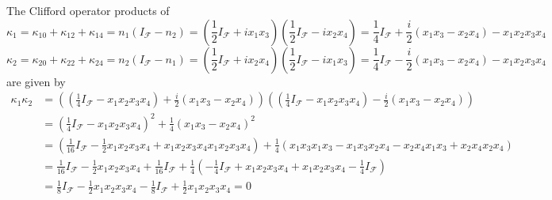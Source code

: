 \documentclass[aps,preprint]{revtex4}%
\begin{document}
The Clifford operator products of
\begin{equation}
\kappa_{1}=\kappa_{10}+\kappa_{12}+\kappa_{14}=n_{1}\left(  I_{\mathcal{F}%
}-n_{2}\right)  =\left(  \frac{1}{2}I_{\mathcal{F}}+ix_{1}x_{3}\right)
\left(  \frac{1}{2}I_{\mathcal{F}}-ix_{2}x_{4}\right)  =\frac{1}%
{4}I_{\mathcal{F}}+\frac{i}{2}\left(  x_{1}x_{3}-x_{2}x_{4}\right)
-x_{1}x_{2}x_{3}x_{4}%
\end{equation}%
\begin{equation}
\kappa_{2}=\kappa_{20}+\kappa_{22}+\kappa_{24}=n_{2}\left(  I_{\mathcal{F}%
}-n_{1}\right)  =\left(  \frac{1}{2}I_{\mathcal{F}}+ix_{2}x_{4}\right)
\left(  \frac{1}{2}I_{\mathcal{F}}-ix_{1}x_{3}\right)  =\frac{1}%
{4}I_{\mathcal{F}}-\frac{i}{2}\left(  x_{1}x_{3}-x_{2}x_{4}\right)
-x_{1}x_{2}x_{3}x_{4}%
\end{equation}
are given by%
\begin{align*}
\kappa_{1}\kappa_{2} &  =\left(  \left(  \frac{1}{4}I_{\mathcal{F}}-x_{1}%
x_{2}x_{3}x_{4}\right)  +\frac{i}{2}\left(  x_{1}x_{3}-x_{2}x_{4}\right)
\right)  \left(  \left(  \frac{1}{4}I_{\mathcal{F}}-x_{1}x_{2}x_{3}%
x_{4}\right)  -\frac{i}{2}\left(  x_{1}x_{3}-x_{2}x_{4}\right)  \right)  \\
&  =\left(  \frac{1}{4}I_{\mathcal{F}}-x_{1}x_{2}x_{3}x_{4}\right)  ^{2}%
+\frac{1}{4}\left(  x_{1}x_{3}-x_{2}x_{4}\right)  ^{2}\\
&  =\left(  \frac{1}{16}I_{\mathcal{F}}-\frac{1}{2}x_{1}x_{2}x_{3}x_{4}%
+x_{1}x_{2}x_{3}x_{4}x_{1}x_{2}x_{3}x_{4}\right)  +\frac{1}{4}\left(
x_{1}x_{3}x_{1}x_{3}-x_{1}x_{3}x_{2}x_{4}-x_{2}x_{4}x_{1}x_{3}+x_{2}x_{4}%
x_{2}x_{4}\right)  \\
&  =\frac{1}{16}I_{\mathcal{F}}-\frac{1}{2}x_{1}x_{2}x_{3}x_{4}+\frac{1}%
{16}I_{\mathcal{F}}+\frac{1}{4}\left(  -\frac{1}{4}I_{\mathcal{F}}+x_{1}%
x_{2}x_{3}x_{4}+x_{1}x_{2}x_{3}x_{4}-\frac{1}{4}I_{\mathcal{F}}\right)  \\
&  =\frac{1}{8}I_{\mathcal{F}}-\frac{1}{2}x_{1}x_{2}x_{3}x_{4}-\frac{1}%
{8}I_{\mathcal{F}}+\frac{1}{2}x_{1}x_{2}x_{3}x_{4}=0
\end{align*}%
\end{document}

